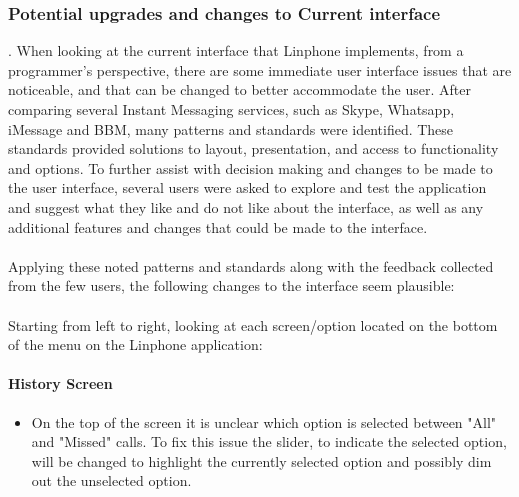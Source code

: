 \documentclass[11pt]{article}
\begin{document}
\subsubsection{Potential upgrades and changes to Current interface}.\newline
When looking at the current interface that Linphone implements, from a programmer's perspective, there are some immediate user interface issues that are noticeable, and that can be changed to better accommodate the user. After comparing several Instant Messaging services, such as Skype, Whatsapp, iMessage and BBM, many patterns and standards were identified. These standards provided solutions to layout, presentation, and access to functionality and options. To further assist with decision making and changes to be made to the user interface, several users were asked to explore and test the application and suggest what they like and do not like about the interface, as well as any additional features and changes that could be made to the interface.\\\\
Applying these noted patterns and standards along with the feedback collected from the few users, the following changes to the interface seem plausible: \\\\
Starting from left to right, looking at each screen/option located on the bottom of the menu on the Linphone application:
\paragraph{History Screen}
\begin{itemize}
\item On the top of the screen it is unclear which option is selected between "All" and "Missed" calls. To fix this issue the slider, to indicate the selected option, will be changed to highlight the currently selected option and possibly dim out the unselected option.
\end{itemize}
\end{document}
